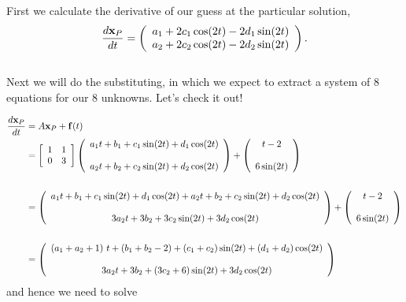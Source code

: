 \begin{itemize}
First we calculate the derivative of our guess at the particular solution,\\
$$\frac{d{\bf{x}}_P}{dt} = \left( \begin{array}{c} a_1 + 2c_1\cos(2t) - 2d_1\sin(2t) \\ a_2 +  2c_2\cos(2t) - 2d_2\sin(2t)  \end{array}  \right).$$\\
%
Next we will do the substituting, in which we expect to extract a system of $8$ equations for our $8$ unknowns. Let's check it out!

\begin{align*}
\frac{d{\bf{x}}_P}{dt} &= A{\bf{x}}_P + {\bf{f}}(t) \\
&=  \left[ \begin{array}{cc} 1 & 1 \\ 0 & 3  \\  \end{array}\right] \left( \begin{array}{c} a_1t + b_1 + c_1\sin(2t) + d_1\cos(2t) \\ \\  a_2t + b_2 + c_2\sin(2t) + d_2\cos(2t)  \end{array}  \right) + \left(  \begin{array}{c} t-2\\ \\ 6\sin(2t)\\ \end{array} \right) \\ \\
&= \left( \begin{array}{c}  a_1t+b_1+c_1\sin(2t)+d_1\cos(2t)+a_2t+b_2+c_2\sin(2t)+d_2\cos(2t)\\ \\  3a_2t + 3b_2+ 3c_2\sin(2t)+3d_2\cos(2t)  \end{array} \right) + \left( \begin{array}{c}  t-2 \\  \\ 6\sin(2t)  \end{array} \right)  \\ \\
&= \left( \begin{array}{c} (a_1+a_2+1)\ t+(b_1+b_2-2)+(c_1+c_2)\sin(2t)+(d_1+d_2)\cos(2t) \\ \\   3a_2t + 3b_2+ (3c_2+6)\sin(2t)+3d_2\cos(2t)      \end{array} \right) \\
\end{align*} 
%
and hence we need to solve


\end{itemize}
